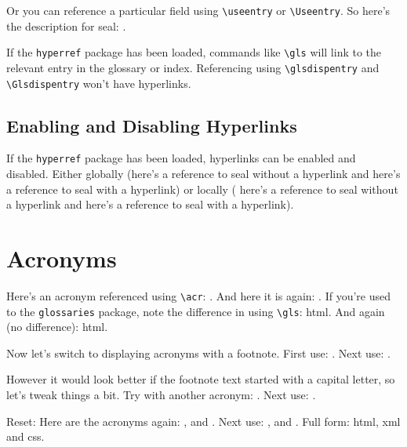 \documentclass{book}
\begin{document}
Or you can reference a particular field using \verb|\useentry| or
\verb|\Useentry|. So here's the description for \gls{seal}:
.

If the \texttt{hyperref} package has been loaded, commands like
\verb|\gls| will link to the relevant entry in the glossary or
index. Referencing using \verb|\glsdispentry| and
\verb|\Glsdispentry| won't have hyperlinks.

\subsection{Enabling and Disabling Hyperlinks}

If the \texttt{hyperref} package has been loaded, hyperlinks can be
enabled and disabled. Either globally
\DTLgidxDisableHyper
(here's a reference to \gls{seal} without a hyperlink 
\DTLgidxEnableHyper
 and here's a reference to \gls{seal} with a hyperlink)
or locally
({%
  \DTLgidxDisableHyper
  here's a reference to \gls{seal} without a hyperlink
}%
and here's a reference to \gls{seal} with a hyperlink).

\section{Acronyms}

Here's an \gls{acronym} referenced using \verb|\acr|: . And here
it is again: . If you're used to the \texttt{glossaries}
package, note the difference in using \verb|\gls|: \gls{html}.
And again (no difference): \gls{html}.

Now let's switch to displaying acronyms with a footnote.
\renewcommand*{\DTLgidxAcrStyle}[2]{%
  #2\footnote{#1.}%
}%
First use: . Next use: .

However it would look better if the footnote text started with a
capital letter, so let's tweak things a bit.
\renewcommand*{\DTLgidxFormatAcr}[3]{%
  \DTLgidxAcrStyle{\Glsdispentry{#1}{#2}}{\useentry{#1}{#3}}%
}%
\renewcommand*{\DTLgidxFormatAcrUC}[3]{%
  \DTLgidxAcrStyle{\Glsdispentry{#1}{#2}}{\Useentry{#1}{#3}}%
}%
Try with another acronym: . Next use: .

Reset: %
\renewcommand*{\DTLgidxAcrStyle}[2]{#1 (#2)}%
\renewcommand*{\DTLgidxFormatAcr}[3]{%
  \DTLgidxAcrStyle{\glsdispentry{#1}{#2}}{\useentry{#1}{#3}}%
}%
\renewcommand*{\DTLgidxFormatAcrUC}[3]{%
  \DTLgidxAcrStyle{\Glsdispentry{#1}{#2}}{\useentry{#1}{#3}}%
}%
Here are the acronyms again:
,  and .
Next use:
,  and .
Full form:
\gls{html}, \gls{xml} and \gls{css}.
\end{document}
